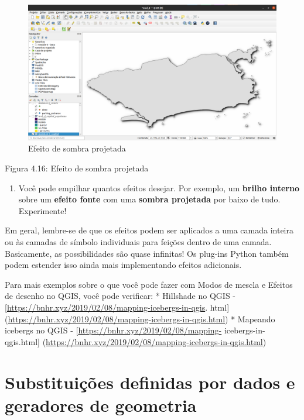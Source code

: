 \documentclass[
  portuguese,
]{krantz}
\providecommand{\tightlist}{%
  \setlength{\itemsep}{0pt}\setlength{\parskip}{0pt}}
\begin{document}
\begin{figure}
\centering
\includegraphics{media/modulo4/drop-shadow-result.png}
\caption{Efeito de sombra projetada}
\end{figure}

Figura 4.16: Efeito de sombra projetada

\begin{enumerate}
\def\labelenumi{\arabic{enumi}.}
\setcounter{enumi}{7}
\tightlist
\item
  Você pode empilhar quantos efeitos desejar. Por exemplo, um \textbf{brilho interno} sobre um \textbf{efeito fonte} com uma \textbf{sombra projetada} por baixo de tudo. Experimente!
\end{enumerate}

Em geral, lembre-se de que os efeitos podem ser aplicados a uma camada inteira ou às camadas de símbolo individuais para feições dentro de uma camada. Basicamente, as possibilidades são quase infinitas! Os plug-ins Python também podem estender isso ainda mais implementando efeitos adicionais.

Para mais exemplos sobre o que você pode fazer com Modos de mescla e Efeitos de desenho no QGIS, você pode verificar:
* Hillshade no QGIS - {[}\url{https://bnhr.xyz/2019/02/08/mapping-icebergs-in-qgis}. html{]} (\url{https://bnhr.xyz/2019/02/08/mapping-icebergs-in-qgis.html})
* Mapeando icebergs no QGIS - {[}\url{https://bnhr.xyz/2019/02/08/mapping-} icebergs-in-qgis.html{]} (\url{https://bnhr.xyz/2019/02/08/mapping-icebergs-in-qgis.html})

\hypertarget{substituiuxe7uxf5es-definidas-por-dados-e-geradores-de-geometria}{%
\section{Substituições definidas por dados e geradores de geometria}\label{substituiuxe7uxf5es-definidas-por-dados-e-geradores-de-geometria}}
\end{document}
